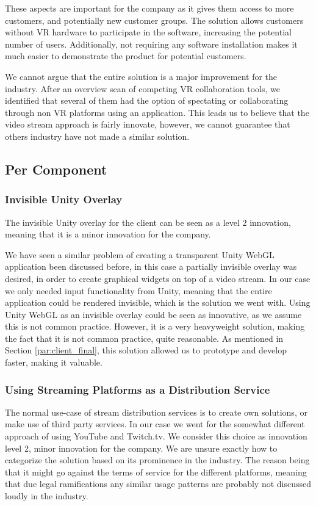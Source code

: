These aspects are important for the company as it gives them access to more customers, and potentially new customer groups. The solution allows customers without VR hardware to participate in the software, increasing the potential number of users. Additionally, not requiring any software installation makes it much easier to demonstrate the product for potential customers.

We cannot argue that the entire solution is a major improvement for the industry. After an overview scan of competing VR collaboration tools, we identified that several of them had the option of spectating or collaborating through non VR platforms using an application. This leads us to believe that the video stream approach is fairly innovate, however, we cannot guarantee that others industry have not made a similar solution.

\subsection{Per Component}
\subsubsection{Invisible Unity Overlay}
The invisible Unity overlay for the client can be seen as a level 2 innovation, meaning that it is a minor innovation for the company\cite{nrcs}. 

We have seen a similar problem of creating a transparent Unity WebGL application been discussed before\cite{unity_transparent_webgl}, in this case a partially invisible overlay was desired, in order to create graphical widgets on top of a video stream\cite{unity_forum_partially_invisible}. In our case we only needed input functionality from Unity, meaning that the entire application could be rendered invisible, which is the solution we went with. Using Unity WebGL as an invisible overlay could be seen as innovative, as we assume this is not common practice. However, it is a very heavyweight solution, making the fact that it is not common practice, quite reasonable. As mentioned in Section \ref{par:client_final}, this solution allowed us to prototype and develop faster, making it valuable.

\subsubsection{Using Streaming Platforms as a Distribution Service}
The normal use-case of stream distribution services is to create own solutions, or make use of third party services. In our case we went for the somewhat different approach of using YouTube and Twitch.tv. We consider this choice as innovation level 2, minor innovation for the company\cite{nrcs}. We are unsure exactly how to categorize the solution based on its prominence in the industry. The reason being that it might go against the terms of service for the different platforms, meaning that due legal ramifications any similar usage patterns are probably not discussed loudly in the industry. 



